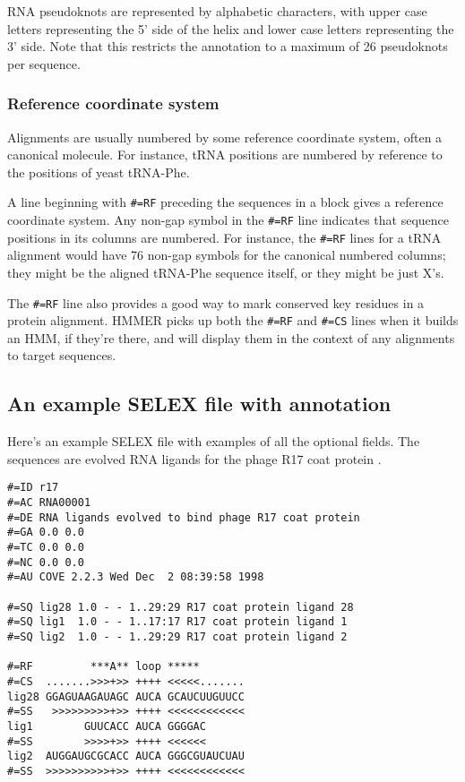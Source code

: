 RNA pseudoknots are represented by alphabetic characters, with upper
case letters representing the 5' side of the helix and lower case
letters representing the 3' side. Note that this restricts the
annotation to a maximum of 26 pseudoknots per sequence.

\subsubsection {Reference coordinate system}

Alignments are usually numbered by some reference coordinate system,
often a canonical molecule. For instance, tRNA positions are numbered
by reference to the positions of yeast tRNA-Phe.

A line beginning with \verb+#=RF+ preceding the sequences in a block
gives a reference coordinate system. Any non-gap symbol in the
\verb+#=RF+ line indicates that sequence positions in its columns are
numbered. For instance, the \verb+#=RF+ lines for a tRNA alignment
would have 76 non-gap symbols for the canonical numbered columns; they
might be the aligned tRNA-Phe sequence itself, or they might be just
X's.

The \verb+#=RF+ line also provides a good way to mark conserved key
residues in a protein alignment. HMMER picks up both the \verb+#=RF+
and \verb+#=CS+ lines when it builds an HMM, if they're there, and
will display them in the context of any alignments to target
sequences.

\subsection{An example SELEX file with annotation}

Here's an example SELEX file with examples of all the optional fields.
The sequences are evolved RNA ligands for the phage R17 coat protein
\cite{Schneider92}.

\begin{verbatim}
#=ID r17
#=AC RNA00001
#=DE RNA ligands evolved to bind phage R17 coat protein 
#=GA 0.0 0.0
#=TC 0.0 0.0
#=NC 0.0 0.0
#=AU COVE 2.2.3 Wed Dec  2 08:39:58 1998

#=SQ lig28 1.0 - - 1..29:29 R17 coat protein ligand 28
#=SQ lig1  1.0 - - 1..17:17 R17 coat protein ligand 1
#=SQ lig2  1.0 - - 1..29:29 R17 coat protein ligand 2

#=RF         ***A** loop *****
#=CS  .......>>>+>> ++++ <<<<<....... 
lig28 GGAGUAAGAUAGC AUCA GCAUCUUGUUCC
#=SS   >>>>>>>>>+>> ++++ <<<<<<<<<<<<
lig1        GUUCACC AUCA GGGGAC
#=SS        >>>>+>> ++++ <<<<<<
lig2  AUGGAUGCGCACC AUCA GGGCGUAUCUAU
#=SS  >>>>>>>>>>+>> ++++ <<<<<<<<<<<<
\end{verbatim}


